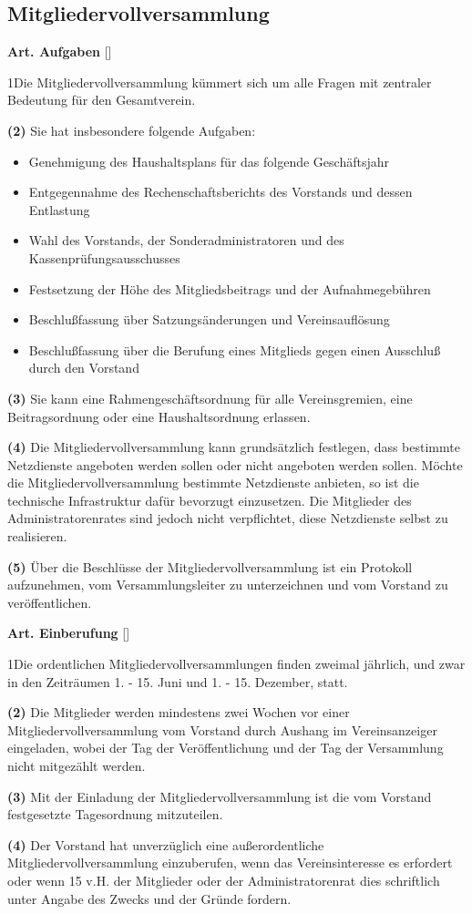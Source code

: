 \documentclass[12pt]{article}
\newcommand{\UAbschnitt}[1]{\subsection{#1}}
\newcommand{\Satz}[2]{

\begin{samepage}
{\bf (#1)} #2
\end{samepage}
}
\newenvironment{Artikel}[2]{
\bigskip \centerline{{\bf Art. #1} [#2]}
\nopagebreak
}{
}
\begin{document}
\UAbschnitt{Mitgliedervollversammlung}

\begin{Artikel}{15}{Aufgaben}

\Satz{1}{Die Mitgliedervollversammlung kümmert sich um alle Fragen mit
zentraler Bedeutung für den Gesamtverein.}

\Satz{2}{Sie hat insbesondere folgende Aufgaben:
\begin{itemize}
\item Genehmigung des Haushaltsplans für das folgende Geschäftsjahr
\item Entgegennahme des Rechenschaftsberichts des Vorstands und dessen 
Entlastung
\item Wahl des Vorstands, der Sonderadministratoren und des 
Kassenprüfungsausschusses
\item Festsetzung der Höhe des Mitgliedsbeitrags und der Aufnahmegebühren
\item Beschlußfassung über Satzungsänderungen und Vereinsauflösung
\item Beschlußfassung über die Berufung eines Mitglieds gegen einen 
Ausschluß durch den Vorstand
\end{itemize}}

\Satz{3}{Sie kann eine Rahmengeschäftsordnung für alle Vereinsgremien, eine
Beitragsordnung oder eine Haushaltsordnung erlassen.}

\Satz{4}{Die Mitgliedervollversammlung kann grundsätzlich festlegen, dass
bestimmte Netzdienste angeboten werden sollen oder nicht angeboten werden
sollen. Möchte die Mitgliedervollversammlung bestimmte Netzdienste anbieten, so
ist die technische Infrastruktur dafür bevorzugt einzusetzen. Die Mitglieder
des Administratorenrates sind jedoch nicht verpflichtet, diese Netzdienste
selbst zu realisieren.}

\Satz{5}{Über die Beschlüsse der Mitgliedervollversammlung ist ein Protokoll
aufzunehmen, vom Versammlungsleiter zu unterzeichnen und vom Vorstand zu
ver\-öffent\-lichen.}

\end{Artikel}

\begin{Artikel}{16}{Einberufung}

\Satz{1}{Die ordentlichen Mitgliedervollversammlungen finden zweimal jährlich,
und zwar in den Zeiträumen 1. - 15. Juni und 1. - 15. Dezember, statt.}

\Satz{2}{Die Mitglieder werden mindestens zwei Wochen vor einer
Mitgliedervollversammlung vom Vorstand durch Aushang im Vereinsanzeiger
eingeladen, wobei der Tag der Ver\-öffent\-lichung und der Tag der Versammlung
nicht mitgezählt werden.}

\Satz{3}{Mit der Einladung der Mitgliedervollversammlung ist die vom Vorstand
festgesetzte Tagesordnung mitzuteilen.}

\Satz{4}{Der Vorstand hat unverzüglich  eine außerordentliche
Mitgliedervollversammlung einzuberufen, wenn das Vereinsinteresse es erfordert
oder wenn 15 v.H. der Mitglieder oder der Administratorenrat dies schriftlich
unter Angabe des Zwecks und der Gründe fordern.}

\end{Artikel}
\end{document}
